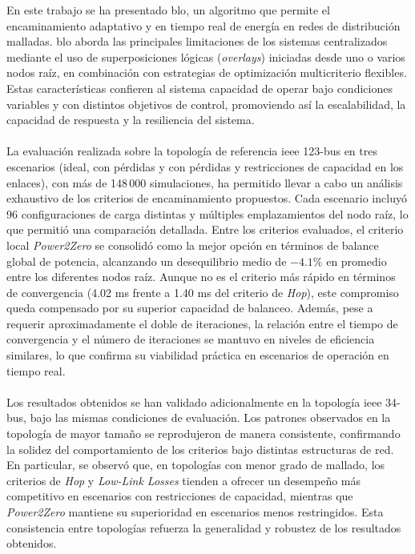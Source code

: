 En este trabajo se ha presentado \gls{blo}, un algoritmo que permite el encaminamiento adaptativo y en tiempo real de energía en redes de distribución malladas. \gls{blo} aborda las principales limitaciones de los sistemas centralizados mediante el uso de superposiciones lógicas (\textit{overlays}) iniciadas desde uno o varios nodos raíz, en combinación con estrategias de optimización multicriterio flexibles. Estas características confieren al sistema capacidad de operar bajo condiciones variables y con distintos objetivos de control, promoviendo así la escalabilidad, la capacidad de respuesta y la resiliencia del sistema.\\
\\
La evaluación realizada sobre la topología de referencia \gls{ieee} 123-bus en tres escenarios (ideal, con pérdidas y con pérdidas y restricciones de capacidad en los enlaces), con más de 148\,000 simulaciones, ha permitido llevar a cabo un análisis exhaustivo de los criterios de encaminamiento propuestos. Cada escenario incluyó 96 configuraciones de carga distintas y múltiples emplazamientos del nodo raíz, lo que permitió una comparación detallada. Entre los criterios evaluados, el criterio local \textit{Power2Zero} se consolidó como la mejor opción en términos de balance global de potencia, alcanzando un desequilibrio medio de $-4.1\%$ en promedio entre los diferentes nodos raíz. Aunque no es el criterio más rápido en términos de convergencia (4.02 ms frente a 1.40 ms del criterio de \textit{Hop}), este compromiso queda compensado por su superior capacidad de balanceo. Además, pese a requerir aproximadamente el doble de iteraciones, la relación entre el tiempo de convergencia y el número de iteraciones se mantuvo en niveles de eficiencia similares, lo que confirma su viabilidad práctica en escenarios de operación en tiempo real.\\
\\
Los resultados obtenidos se han validado adicionalmente en la topología \gls{ieee} 34-bus, bajo las mismas condiciones de evaluación. Los patrones observados en la topología de mayor tamaño se reprodujeron de manera consistente, confirmando la solidez del comportamiento de los criterios bajo distintas estructuras de red. En particular, se observó que, en topologías con menor grado de mallado, los criterios de \textit{Hop} y \textit{Low-Link Losses} tienden a ofrecer un desempeño más competitivo en escenarios con restricciones de capacidad, mientras que \textit{Power2Zero} mantiene su superioridad en escenarios menos restringidos. Esta consistencia entre topologías refuerza la generalidad y robustez de los resultados obtenidos.\\
